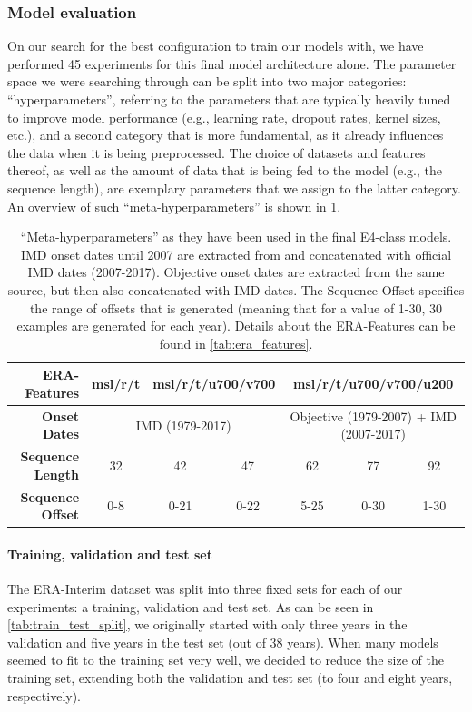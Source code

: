 \subsubsection{Model evaluation}
On our search for the best configuration to train our models with, we have performed 45 experiments for this final model architecture alone. The parameter space we were searching through can be split into two major categories: ``hyperparameters'', referring to the parameters that are typically heavily tuned to improve model performance (e.g., learning rate, dropout rates, kernel sizes, etc.), and a second category that is more fundamental, as it already influences the data when it is being preprocessed. The choice of datasets and features thereof, as well as the amount of data that is being fed to the model (e.g., the sequence length), are exemplary parameters that we assign to the latter category. An overview of such ``meta-hyperparameters'' is shown in \cref{tab:meta_parameters}.

\begin{table}[h]
  \centering
  \begin{tabular}{|r|c|c|c|c|c|c|}
    \hline
    \textbf{ERA-Features} & \multicolumn{1}{c|}{msl/r/t} & \multicolumn{2}{c|}{msl/r/t/u700/v700} & \multicolumn{3}{c|}{msl/r/t/u700/v700/u200} \\
    \hline
    \textbf{Onset Dates} & \multicolumn{3}{c|}{IMD (1979-2017)} & \multicolumn{3}{c|}{Objective (1979-2007) + IMD (2007-2017)} \\
    \hline
    \textbf{Sequence Length} & 32 & 42 & 47 & 62 & 77 & 92 \\
    \hline
    \textbf{Sequence Offset} & 0-8 & 0-21 & 0-22 & 5-25 & 0-30 & 1-30 \\
    \hline
  \end{tabular}
  \caption{``Meta-hyperparameters'' as they have been used in the final E4-class models. IMD onset dates until 2007 are extracted from \citet{Singh.2009} and concatenated with official IMD dates (2007-2017). Objective onset dates are extracted from the same source, but then also concatenated with IMD dates. The Sequence Offset specifies the range of offsets that is generated (meaning that for a value of 1-30, 30 examples are generated for each year). Details about the ERA-Features can be found in \cref{tab:era_features}. }
  \label{tab:meta_parameters}
\end{table}

\paragraph{Training, validation and test set}
The ERA-Interim dataset was split into three fixed sets for each of our experiments: a training, validation and test set. As can be seen in \cref{tab:train_test_split}, we originally started with only three years in the validation and five years in the test set (out of 38 years). When many models seemed to fit to the training set very well, we decided to reduce the size of the training set, extending both the validation and test set (to four and eight years, respectively).

